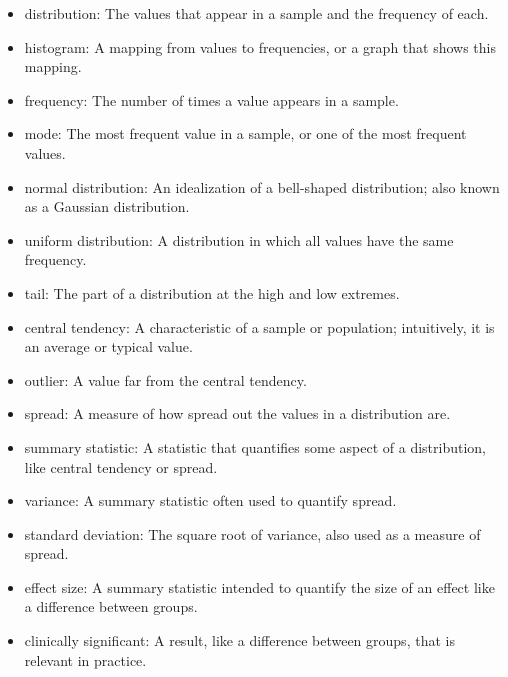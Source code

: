 \documentclass[12pt]{book}
\theoremstyle{exercise}
\begin{document}
\begin{itemize}

\item distribution: The values that appear in a sample
and the frequency of each.%

\item histogram: A mapping from values to frequencies, or a graph
that shows this mapping.%

\item frequency: The number of times a value appears in a sample.%

\item mode: The most frequent value in a sample, or one of the
most frequent values.%

\item normal distribution: An idealization of a bell-shaped distribution;
also known as a Gaussian distribution.%
%

\item uniform distribution: A distribution in which all values have
the same frequency.%

\item tail: The part of a distribution at the high and low extremes.%

\item central tendency: A characteristic of a sample or population;
intuitively, it is an average or typical value.%

\item outlier: A value far from the central tendency.%

\item spread: A measure of how spread out the values in a distribution
are.%

\item summary statistic: A statistic that quantifies some aspect
of a distribution, like central tendency or spread.%

\item variance: A summary statistic often used to quantify spread.%

\item standard deviation: The square root of variance, also used
as a measure of spread.%

\item effect size: A summary statistic intended to quantify the size
of an effect like a difference between groups.%

\item clinically significant: A result, like a difference between groups,
that is relevant in practice.%

\end{itemize}
\end{document}
